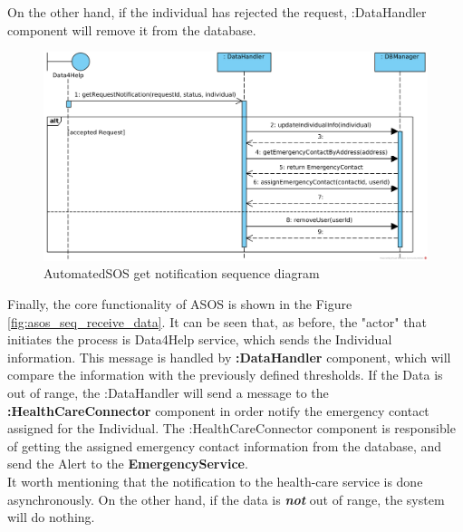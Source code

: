 \documentclass[a4paper, hidelinks, 12pt]{report}
\begin{document}
	On the other hand, if the individual has rejected the request, :DataHandler component will remove it from the database.\\
	
	\begin{figure}[H]
		\centering
		\includegraphics[width=1\textwidth]{diagrams/sequence_diagrams/asos_get_individual_notification.png}
		\caption[AutomatedSOS get notification sequence diagram]{AutomatedSOS get notification sequence diagram}
		\label{fig:asos_seq_get_notification}
	\end{figure}
	
	Finally, the core functionality of ASOS is shown in the Figure \ref{fig:asos_seq_receive_data}. It can be seen that, as before, the "actor" that initiates the process is Data4Help service, which sends the Individual information. This message is handled by \textbf{:DataHandler} component, which will compare the information with the previously defined thresholds. If the Data is out of range, the :DataHandler will send a message to the \textbf{:HealthCareConnector} component in order notify the emergency contact assigned for the Individual. The :HealthCareConnector component is responsible of getting the assigned emergency contact information from the database, and send the Alert to the \textbf{EmergencyService}.\\
	
	It worth mentioning that the notification to the health-care service is done asynchronously. On the other hand, if the data is \textit{\textbf{not}} out of range, the system will do nothing.
	
\end{document}
